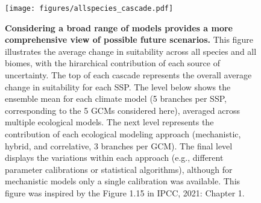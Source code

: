 \documentclass[11pt,letter]{article}
\begin{document}
\begin{figure}
	\centering
	\texttt{[image: figures/allspecies\_cascade.pdf]}
	\caption{\textbf{Considering a broad range of models provides a more comprehensive view of possible future scenarios.} This figure illustrates the average change in suitability across all species and all biomes, with the hirarchical contribution of each source of uncertainty. The top of each cascade represents the overall average change in suitability for each SSP. The level below shows the ensemble mean for each climate model (5 branches per SSP, corresponding to the 5 GCMs considered here), averaged across multiple ecological models. The next level represents the contribution of each ecological modeling approach (mechanistic, hybrid, and correlative, 3 branches per GCM). The final level displays the variations within each approach (e.g., different parameter calibrations or statistical algorithms), although for mechanistic models only a single calibration was available. This figure was inspired by the Figure 1.15 in IPCC, 2021: Chapter 1.}
	\label{fig:cascade}
\end{figure}
\end{document}
